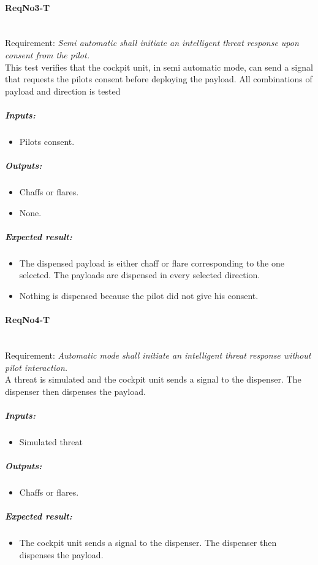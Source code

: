\paragraph{ReqNo3-T}\mbox{}\\ %
Requirement: \textit{Semi automatic shall initiate an intelligent threat response upon consent from the pilot.}
\\
This test verifies that the cockpit unit, in semi automatic mode, can send a signal that requests the pilots consent before deploying the payload. All combinations of payload and direction is tested
\\
	\subparagraph{Inputs:}
	\begin{itemize}
	\item Pilots consent.
	\end{itemize}
	\subparagraph{Outputs:}
	\begin{itemize}
	\item Chaffs or flares.
	\item None.
	\end{itemize}
	\subparagraph{Expected result:}
	\begin{itemize}
	\item The dispensed payload is either chaff or flare corresponding to the one selected. The payloads are dispensed in every selected direction.
	\item Nothing is dispensed because the pilot did not give his consent.
	\end{itemize}


\paragraph{ReqNo4-T}\mbox{}\\ %
Requirement: \textit{Automatic mode shall initiate an intelligent threat response without pilot interaction.}\\
A threat is simulated and the cockpit unit sends a signal to the dispenser. The dispenser then dispenses the payload.
\\
	\subparagraph{Inputs:}
	\begin{itemize}
	\item Simulated threat
	\end{itemize}
	\subparagraph{Outputs:}
	\begin{itemize}
	\item Chaffs or flares.
	\end{itemize}
	\subparagraph{Expected result:}
	\begin{itemize}
	\item The cockpit unit sends a signal to the dispenser. The dispenser then dispenses the payload.
	\end{itemize}



